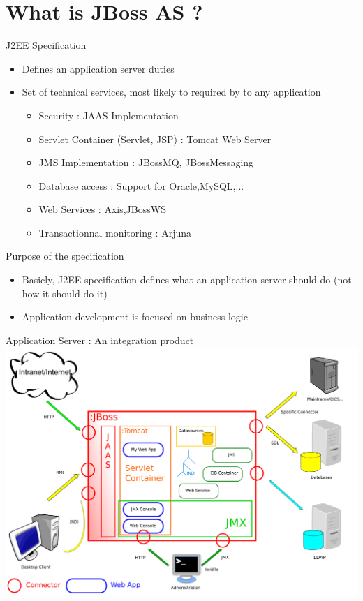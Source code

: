 \documentclass[handout]{beamer}
\begin{document}
\section{What is JBoss AS ?}
	\begin{frame}
		\begin{block}{J2EE Specification}
			\begin{itemize}
				\item Defines an application server duties
				\item Set of technical services, most likely to required by to any application
				\begin{itemize}
					\item Security : JAAS Implementation
					\item Servlet Container (Servlet, JSP) : Tomcat Web Server
					\item JMS Implementation : JBossMQ, JBossMessaging
					\item Database access : Support for Oracle,MySQL,...
					\item Web Services : Axis,JBossWS
					\item Transactionnal monitoring : Arjuna
				\end{itemize}
			\end{itemize}
		\end{block}
		\begin{block}{Purpose of the specification}
			\begin{itemize}
				\item Basicly, J2EE specification defines what an application server should do (not how it should do it)
				\item Application development is focused on business logic
			\end{itemize}
		\end{block}

	\end{frame}
	\begin{frame}
		Application Server : An integration product
\includegraphics[scale=0.4]{../img/whatisjbossas.png}
	\end{frame}
\end{document}
